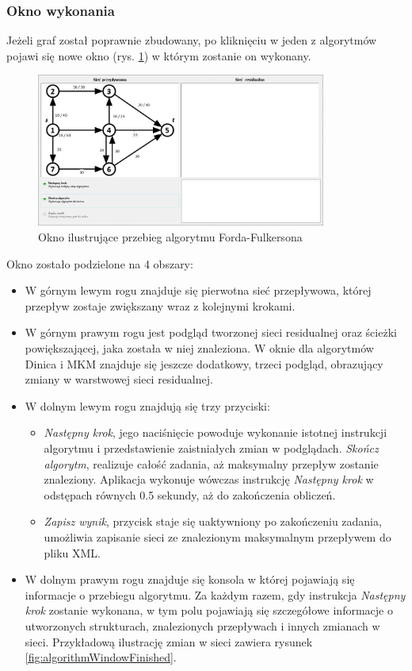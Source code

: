 \subsubsection{Okno wykonania}
Jeżeli graf został poprawnie zbudowany, po kliknięciu w jeden z algorytmów pojawi się nowe okno (rys. \ref{fig:algorithmWindowStart}) w którym zostanie on wykonany.
\begin{figure}[H]
	\centering
	\includegraphics[width=0.85\textwidth]{./img/spec_zew06_1}
	\caption{Okno ilustrujące przebieg algorytmu Forda-Fulkersona}
	\label{fig:algorithmWindowStart}
\end{figure}\noindent
Okno zostało podzielone na 4 obszary:
\begin{itemize}
	\item W górnym lewym rogu znajduje się pierwotna sieć przepływowa, której przepływ zostaje zwiększany wraz z kolejnymi krokami.
	\item W górnym prawym rogu jest podgląd tworzonej sieci residualnej oraz ścieżki powiększającej, jaka została w niej znaleziona. W oknie dla algorytmów Dinica i MKM znajduje się jeszcze dodatkowy, trzeci podgląd, obrazujący zmiany w warstwowej sieci residualnej.
	\item W dolnym lewym rogu znajdują się trzy przyciski:
	\begin{itemize}
		\item \textit{Następny krok}, jego naciśnięcie powoduje wykonanie istotnej instrukcji algorytmu i przedstawienie zaistniałych zmian w podglądach.
		\textit{Skończ algorytm}, realizuje całość zadania, aż maksymalny przepływ zostanie znaleziony. Aplikacja wykonuje wówczas instrukcję \textit{Następny krok} w odstępach równych 0.5 sekundy, aż do zakończenia obliczeń.
		\item \textit{Zapisz wynik}, przycisk staje się uaktywniony po zakończeniu zadania, umożliwia zapisanie sieci ze znalezionym maksymalnym przepływem do pliku XML.
	\end{itemize}
	\item W dolnym prawym rogu znajduje się konsola w której pojawiają się informacje o przebiegu algorytmu. Za każdym razem, gdy instrukcja \textit{Następny krok} zostanie wykonana, w tym polu pojawiają się szczegółowe informacje o utworzonych strukturach, znalezionych przepływach i innych zmianach w sieci. Przykładową ilustrację zmian w sieci zawiera rysunek \ref{fig:algorithmWindowFinished}.
\end{itemize}
